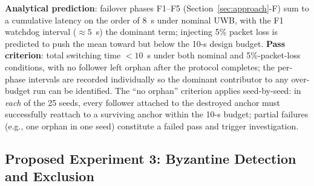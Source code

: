 \documentclass[conference,10pt]{IEEEtran}
\begin{document}
\textbf{Analytical prediction}: failover phases F1--F5 (Section~\ref{sec:approach}-F) sum to a cumulative latency on the order of 8~s under nominal UWB, with the F1 watchdog interval ($\approx 5$~s) the dominant term; injecting 5\% packet loss is predicted to push the mean toward but below the 10-s design budget.
\textbf{Pass criterion}: total switching time $<10$~s under both nominal and 5\%-packet-loss conditions, with no follower left orphan after the protocol completes; the per-phase intervals are recorded individually so the dominant contributor to any over-budget run can be identified. The ``no orphan'' criterion applies seed-by-seed: in \emph{each} of the 25 seeds, every follower attached to the destroyed anchor must successfully reattach to a surviving anchor within the 10-s budget; partial failures (e.g., one orphan in one seed) constitute a failed pass and trigger investigation. %

\subsection{Proposed Experiment 3: Byzantine Detection and Exclusion}
\label{sec:exp3-byz-detection}
\end{document}
